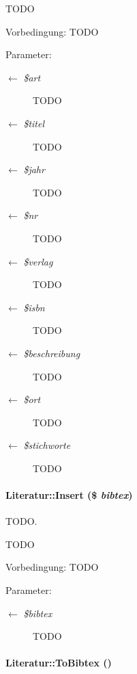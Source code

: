 TODO \begin{Desc}
\item[Vorbedingung:]TODO \end{Desc}
\begin{Desc}
\item[Parameter:]
\begin{description}
\item[\mbox{$\leftarrow$} {\em \$art}]TODO \item[\mbox{$\leftarrow$} {\em \$titel}]TODO \item[\mbox{$\leftarrow$} {\em \$jahr}]TODO \item[\mbox{$\leftarrow$} {\em \$nr}]TODO \item[\mbox{$\leftarrow$} {\em \$verlag}]TODO \item[\mbox{$\leftarrow$} {\em \$isbn}]TODO \item[\mbox{$\leftarrow$} {\em \$beschreibung}]TODO \item[\mbox{$\leftarrow$} {\em \$ort}]TODO \item[\mbox{$\leftarrow$} {\em \$stichworte}]TODO \end{description}
\end{Desc}
\hypertarget{classLiteratur_fbaac222c1150d9a6250119aedd83ea5}{
\paragraph[Insert]{\setlength{\rightskip}{0pt plus 5cm}Literatur::Insert (\$ {\em bibtex})}\hfill}
\label{classLiteratur_fbaac222c1150d9a6250119aedd83ea5}


TODO. 

TODO \begin{Desc}
\item[Vorbedingung:]TODO \end{Desc}
\begin{Desc}
\item[Parameter:]
\begin{description}
\item[\mbox{$\leftarrow$} {\em \$bibtex}]TODO \end{description}
\end{Desc}
\hypertarget{classLiteratur_11f6d1a4409c41638ff6693f65699ff3}{
\paragraph[ToBibtex]{\setlength{\rightskip}{0pt plus 5cm}Literatur::To\-Bibtex ()}\hfill}
\label{classLiteratur_11f6d1a4409c41638ff6693f65699ff3}


